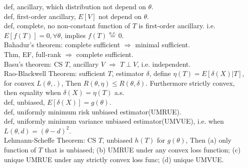 \documentclass[paper=a4, fontsize=11pt]{scrartcl} %
\numberwithin{equation}{section} %
\numberwithin{figure}{section} %
\numberwithin{table}{section} %
\begin{document}
def, ancillary, which distribution not depend on $\theta$.\\
def, first-order ancillary, $E[V]$ not depend on $\theta$.\\
def, complete, no non-constant function of $T$ is first-order ancillary. i.e. $E[f(T)]=0,\forall \theta$, implies $f(T)\stackrel{a.e.}{=}0$.\\
Bahadur's theorem: complete sufficient $\Rightarrow$ minimal sufficient.\\
Thm, EF, full-rank $\Rightarrow$ complete sufficient.\\
Basu's theorem: CS $T$, ancillary $V$ $\Rightarrow$ $T\perp V$, i.e. independent.\\
Rao-Blackwell Theorem: sufficient $T$, estimator $\delta$, define $\eta(T)=E[\delta(X)|T]$, for convex $L(\theta,.)$, Then $R(\theta,\eta)\leq R(\theta,\delta)$. Furthermore strictly convex, then equality when $\delta(X)=\eta(T)$ a.s.\\
def, unbiased, $E[\delta(X)]=g(\theta)$.\\
def, uniformly minimum risk unbiased estimator(UMRUE).\\
def, uniformly minimum variance unbiased estimator(UMVUE), i.e. when $L(\theta,d)=(\theta-d)^2$.\\
Lehmann-Scheffe Theorem: CS $T$, unbiased $h(T)$ for $g(\theta)$, Then (a) only function of $T$ that is unbiased; (b) UMRUE under any convex loss function; (c) unique UMRUE under any strictly convex loss func; (d) unique UMVUE.
\end{document}
